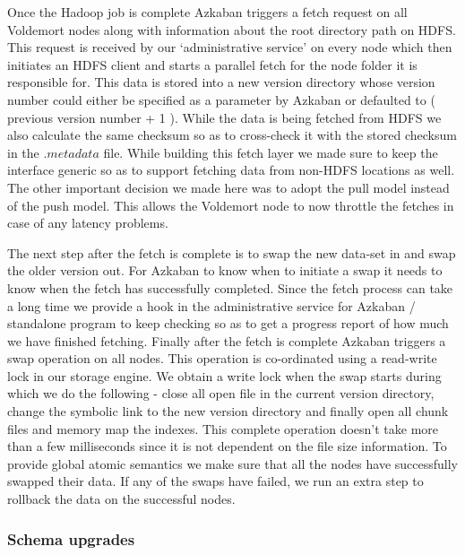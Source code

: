 \documentclass[10pt,twocolumn,preprint,natbib,authoryear]{sigplanconf}
\begin{document}
Once the Hadoop job is complete Azkaban triggers a fetch request on all Voldemort nodes along with information about the root directory path on HDFS. This request is received by our `administrative service' on every node which then initiates an HDFS client and starts a parallel fetch for the node folder it is responsible for. This data is stored into a new version directory whose version number could either be specified as a parameter by Azkaban or defaulted to ( previous version number + 1 ). While the data is being fetched from HDFS we also calculate the same checksum so as to cross-check it with the stored checksum in the $.metadata$ file. While building this fetch layer we made sure to keep the interface generic so as to support fetching data from non-HDFS locations as well. The other important decision we made here was to adopt the pull model instead of the push model. This allows the Voldemort node to now throttle the fetches in case of any latency problems. 

The next step after the fetch is complete is to swap the new data-set in and swap the older version out. For Azkaban to know when to initiate a swap it needs to know when the fetch has successfully completed. Since the fetch process can take a long time we provide a hook in the administrative service for Azkaban / standalone program to keep checking so as to get a progress report of how much we have finished fetching. Finally after the fetch is complete Azkaban triggers a swap operation on all nodes. This operation is co-ordinated using a read-write lock in our storage engine. We obtain a write lock when the swap starts during which we do the following - close all open file in the current version directory, change the symbolic link to the new version directory and finally open all chunk files and memory map the indexes. This complete operation doesn't take more than a few milliseconds since it is not dependent on the file size information. To provide global atomic semantics we make sure that all the nodes have successfully swapped their data. If any of the swaps have failed, we run an extra step to rollback the data on the successful nodes.



\subsubsection{Schema upgrades}
\label{sec:read_only:data_cycle:schema_upgrades}
\end{document}
